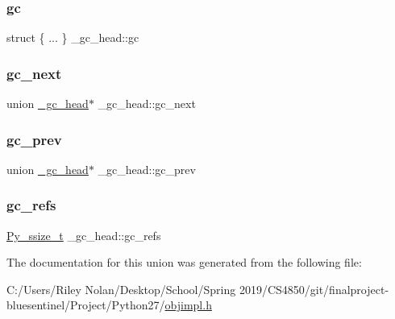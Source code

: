 \mbox{\label{union__gc__head_a8c18537f7d7334632b95a32d4ba6ee82}} 
\subsubsection{\texorpdfstring{gc}{gc}}
{\footnotesize\ttfamily struct \{ ... \}   \+\_\+gc\+\_\+head\+::gc}

\mbox{\label{union__gc__head_a1ecfab1b9a966dd1d7f861e91dfb4431}} 
\subsubsection{\texorpdfstring{gc\_next}{gc\_next}}
{\footnotesize\ttfamily union \mbox{\hyperlink{union__gc__head}{\+\_\+gc\+\_\+head}}$\ast$ \+\_\+gc\+\_\+head\+::gc\+\_\+next}

\mbox{\label{union__gc__head_ab555545d58e92dbb75891616a50502b5}} 
\subsubsection{\texorpdfstring{gc\_prev}{gc\_prev}}
{\footnotesize\ttfamily union \mbox{\hyperlink{union__gc__head}{\+\_\+gc\+\_\+head}}$\ast$ \+\_\+gc\+\_\+head\+::gc\+\_\+prev}

\mbox{\label{union__gc__head_ac1c34c7f388c2eb1ab37198fafea082a}} 
\subsubsection{\texorpdfstring{gc\_refs}{gc\_refs}}
{\footnotesize\ttfamily \mbox{\hyperlink{pyport_8h_ac6411a3dfda9ac6feb9e8d859b1184bc}{Py\+\_\+ssize\+\_\+t}} \+\_\+gc\+\_\+head\+::gc\+\_\+refs}



The documentation for this union was generated from the following file\+:\begin{DoxyCompactItemize}
\item 
C\+:/\+Users/\+Riley Nolan/\+Desktop/\+School/\+Spring 2019/\+C\+S4850/git/finalproject-\/bluesentinel/\+Project/\+Python27/\mbox{\hyperlink{objimpl_8h}{objimpl.\+h}}\end{DoxyCompactItemize}
